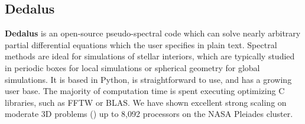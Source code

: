 {\color{purple}    
\subsection{Dedalus}}

\textbf{Dedalus} is an open-source pseudo-spectral code which can solve nearly arbitrary partial differential equations which the user specifies in plain text. Spectral methods are ideal for simulations of stellar interiors, which are typically studied in periodic boxes for local simulations or spherical geometry for global simulations. It is based in Python, is straightforward to use, and has a growing user base. The majority of computation time is spent executing optimizing C libraries, such as FFTW or BLAS. We have shown excellent strong scaling on moderate 3D problems () up to 8,092 processors on the NASA Pleiades cluster.



